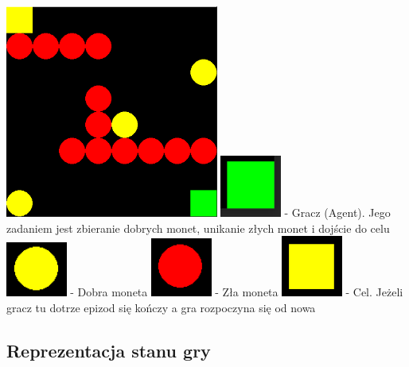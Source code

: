 \documentclass[a4paper,12pt]{article}
\begin{document}
\includegraphics[width=70mm]{przyklad2.png} \newline \newline
\includegraphics[width=20mm]{player.png} - Gracz (Agent). Jego zadaniem jest zbieranie dobrych monet, unikanie złych monet i dojście do celu \newline
\includegraphics[width=20mm]{good_coin.png} - Dobra moneta \newline
\includegraphics[width=20mm]{bad_coin.png} - Zła moneta\newline
\includegraphics[width=20mm]{exit.png} - Cel. Jeżeli gracz tu dotrze epizod się kończy a gra rozpoczyna się od nowa\newline

\subsection{Reprezentacja stanu gry}
\end{document}
